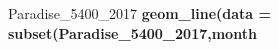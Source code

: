 \documentclass[]{book}
\newenvironment{Shaded}{\begin{snugshade}}{\end{snugshade}}
\newcommand{\KeywordTok}[1]{\textcolor[rgb]{0.13,0.29,0.53}{\textbf{#1}}}
\newcommand{\DataTypeTok}[1]{\textcolor[rgb]{0.13,0.29,0.53}{#1}}
\newcommand{\DecValTok}[1]{\textcolor[rgb]{0.00,0.00,0.81}{#1}}
\newcommand{\StringTok}[1]{\textcolor[rgb]{0.31,0.60,0.02}{#1}}
\newcommand{\OperatorTok}[1]{\textcolor[rgb]{0.81,0.36,0.00}{\textbf{#1}}}
\newcommand{\NormalTok}[1]{#1}
\theoremstyle{definition}
\theoremstyle{definition}
\theoremstyle{definition}
\theoremstyle{remark}
\begin{document}
\begin{Shaded}
\begin{Highlighting}[]
\NormalTok{Paradise_5400_}\DecValTok{2017} \OperatorTok{%>%}\StringTok{ }\KeywordTok{group_by}\NormalTok{(date,month,day,hr) }\OperatorTok{%>%}\StringTok{ }\KeywordTok{filter}\NormalTok{(}\KeywordTok{as.numeric}\NormalTok{(month) }\OperatorTok{%in%}\StringTok{ }\KeywordTok{c}\NormalTok{(}\DecValTok{7}\NormalTok{,}\DecValTok{8}\NormalTok{,}\DecValTok{9}\NormalTok{) }\OperatorTok{&}\StringTok{ }\KeywordTok{as.numeric}\NormalTok{(day) }\OperatorTok{%in%}\StringTok{ }\KeywordTok{c}\NormalTok{(}\DecValTok{15}\NormalTok{,}\DecValTok{16}\NormalTok{,}\DecValTok{17}\NormalTok{,}\DecValTok{18}\NormalTok{,}\DecValTok{19}\NormalTok{,}\DecValTok{20}\NormalTok{) ) }\OperatorTok{%>%}\StringTok{ }\KeywordTok{ggplot}\NormalTok{(}\KeywordTok{aes}\NormalTok{(}\DataTypeTok{x =}\NormalTok{ hr, }\DataTypeTok{y =}\NormalTok{ Temperature..deg.F.,}\DataTypeTok{color=}\NormalTok{month)) }\OperatorTok{+}\StringTok{ }\KeywordTok{geom_line}\NormalTok{(}\DataTypeTok{data =} \KeywordTok{subset}\NormalTok{(Paradise_5400_}\DecValTok{2017}\NormalTok{,month }\OperatorTok{%in%}\StringTok{ }\KeywordTok{c}\NormalTok{(}\StringTok{"07"}\NormalTok{) }\OperatorTok{&}\StringTok{ }\NormalTok{day }\OperatorTok{%in%}\StringTok{ }\KeywordTok{c}\NormalTok{(}\StringTok{"15"}\NormalTok{)  ))}\OperatorTok{+}\StringTok{ }\KeywordTok{geom_line}\NormalTok{(}\DataTypeTok{data =} \KeywordTok{subset}\NormalTok{(Paradise_5400_}\DecValTok{2017}\NormalTok{,month }\OperatorTok{%in%}\StringTok{ }\KeywordTok{c}\NormalTok{(}\StringTok{"08"}\NormalTok{) }\OperatorTok{&}\StringTok{ }\NormalTok{day }\OperatorTok{%in%}\StringTok{ }\KeywordTok{c}\NormalTok{(}\StringTok{"15"}\NormalTok{)  ))}\OperatorTok{+}\StringTok{ }\KeywordTok{geom_line}\NormalTok{(}\DataTypeTok{data =} \KeywordTok{subset}\NormalTok{(Paradise_5400_}\DecValTok{2017}\NormalTok{,month }\OperatorTok{%in%}\StringTok{ }\KeywordTok{c}\NormalTok{(}\StringTok{"09"}\NormalTok{) }\OperatorTok{&}\StringTok{ }\NormalTok{day }\OperatorTok{%in%}\StringTok{ }\KeywordTok{c}\NormalTok{(}\StringTok{"15"}\NormalTok{)  ))  }\OperatorTok{+}
\KeywordTok{geom_line}\NormalTok{(}\DataTypeTok{data =} \KeywordTok{subset}\NormalTok{(Paradise_5400_}\DecValTok{2017}\NormalTok{,month }\OperatorTok{%in%}\StringTok{ }\KeywordTok{c}\NormalTok{(}\StringTok{"07"}\NormalTok{) }\OperatorTok{&}\StringTok{ }\NormalTok{day }\OperatorTok{%in%}\StringTok{ }\KeywordTok{c}\NormalTok{(}\StringTok{"16"}\NormalTok{)  ))}\OperatorTok{+}\StringTok{ }\KeywordTok{geom_line}\NormalTok{(}\DataTypeTok{data =} \KeywordTok{subset}\NormalTok{(Paradise_5400_}\DecValTok{2017}\NormalTok{,month }\OperatorTok{%in%}\StringTok{ }\KeywordTok{c}\NormalTok{(}\StringTok{"08"}\NormalTok{) }\OperatorTok{&}\StringTok{ }\NormalTok{day }\OperatorTok{%in%}\StringTok{ }\KeywordTok{c}\NormalTok{(}\StringTok{"16"}\NormalTok{)  ))}\OperatorTok{+}\StringTok{ }\KeywordTok{geom_line}\NormalTok{(}\DataTypeTok{data =} \KeywordTok{subset}\NormalTok{(Paradise_5400_}\DecValTok{2017}\NormalTok{,month }\OperatorTok{%in%}\StringTok{ }\KeywordTok{c}\NormalTok{(}\StringTok{"09"}\NormalTok{) }\OperatorTok{&}\StringTok{ }\NormalTok{day }\OperatorTok{%in%}\StringTok{ }\KeywordTok{c}\NormalTok{(}\StringTok{"16"}\NormalTok{)  ))  }\OperatorTok{+}
}}
\end{Highlighting}
\end{Shaded}
\end{document}
